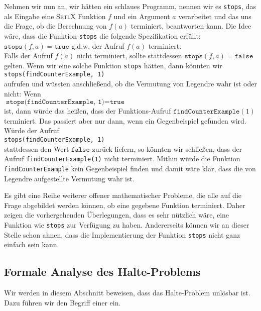 Nehmen wir nun an, wir hätten ein schlaues Programm, nennen wir es \texttt{stops}, das als Eingabe
eine \textsc{SetlX} Funktion $f$ und ein Argument $a$ verarbeitet und das uns die Frage, ob die Berechnung von $f(a)$
terminiert, beantworten kann.  Die Idee wäre, dass die Funktion \texttt{stops} die folgende Spezifikation erfüllt:
\\[0.2cm]
\hspace*{1.3cm}
$\texttt{stops}(f, a) = \texttt{true}$ \quad g.d.w. \quad der Aufruf $f(a)$ terminiert.
\\[0.2cm]
Falls der Aufruf $f(a)$ nicht terminiert,  sollte stattdessen $\texttt{stops}(f,a) = \texttt{false}$ gelten.
Wenn wir eine solche Funktion \texttt{stops} hätten, dann könnten wir 
\\[0.2cm]
\hspace*{1.3cm}
\texttt{stops(findCounterExample, 1)}
\\[0.2cm]
aufrufen und wüssten anschließend, ob die Vermutung von Legendre wahr ist oder nicht:  Wenn
\\[0.2cm]
\hspace*{1.3cm}
$\texttt{stops(findCounterExample, 1)} = \texttt{true}$
 \\[0.2cm]
ist, dann würde das heißen,
dass der Funktions-Aufruf $\texttt{findCounterExample}(1)$ terminiert.  Das passiert aber nur dann,
wenn ein Gegenbeispiel gefunden wird.  Würde der Aufruf 
\\[0.2cm]
\hspace*{1.3cm}
\texttt{stops(findCounterExample, 1)}
\\[0.2cm]
stattdessen den Wert  $\texttt{false}$ zurück liefern, so könnten wir schließen, dass der Aufruf \texttt{findCounterExample(1)}
nicht terminiert. Mithin würde die Funktion \texttt{findCounterExample} kein Gegenbeispiel finden und
damit wäre klar, dass die von Legendre aufgestellte Vermutung wahr ist.

Es gibt eine Reihe weiterer offener  mathematischer Probleme, die alle auf die Frage abgebildet
werden können, ob eine gegebene Funktion terminiert.  Daher zeigen die vorhergehenden Überlegungen,
dass es sehr nützlich wäre, eine Funktion wie \texttt{stops} zur Verfügung zu haben.  Andererseits
können wir an dieser Stelle schon ahnen, dass die Implementierung der Funktion \texttt{stops}
nicht ganz einfach sein kann.  

 
\subsection{Formale Analyse des Halte-Problems}
Wir werden in diesem Abschnitt beweisen, dass das Halte-Problem unlösbar ist.  Dazu führen
wir den Begriff einer  ein.  
\pagebreak

